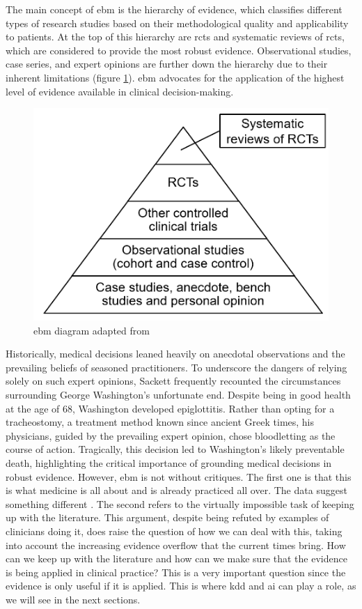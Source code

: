 The main concept of \ac{ebm} is the hierarchy of evidence, which classifies different types of research studies based on their methodological quality and applicability to patients. At the top of this hierarchy are \acp{rct} and systematic reviews of \acp{rct}, which are considered to provide the most robust evidence. Observational studies, case series, and expert opinions are further down the hierarchy due to their inherent limitations (figure \ref{fig:ebm}). \ac{ebm} advocates for the application of the highest level of evidence available in clinical decision-making.
\begin{figure}
    \centering
    \includegraphics[scale=0.55]{figures/ebm.png}
    
    \caption{\acl{ebm} diagram adapted from \cite{greenhalghHowReadPaper2019}} \label{fig:ebm}
    \end{figure}

Historically, medical decisions leaned heavily on anecdotal observations and the prevailing beliefs of seasoned practitioners. To underscore the dangers of relying solely on such expert opinions, Sackett frequently recounted the circumstances surrounding George Washington's unfortunate end. Despite being in good health at the age of 68, Washington developed epiglottitis. Rather than opting for a tracheostomy, a treatment method known since ancient Greek times, his physicians, guided by the prevailing expert opinion, chose bloodletting as the course of action. Tragically, this decision led to Washington's likely preventable death, highlighting the critical importance of grounding medical decisions in robust evidence.
However, \ac{ebm} is not without critiques. The first one is that this is what medicine is all about and is already practiced all over. The data suggest something different \cite{sackettEvidenceBasedMedicine1996}.
The second refers to the virtually impossible task of keeping up with the literature. This argument, despite being refuted by examples of clinicians doing it, does raise the question of how we can deal with this, taking into account the increasing evidence overflow that the current times bring. How can we keep up with the literature and how can we make sure that the evidence is being applied in clinical practice? This is a very important question since the evidence is only useful if it is applied. This is where \ac{kdd} and \ac{ai} can play a role, as we will see in the next sections. 


